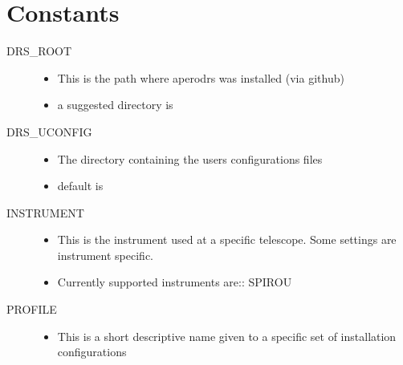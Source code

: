 \documentclass[a4paper,10pt,english]{report}
\begin{document}
\section{Constants}
\label{\detokenize{misc/glossary:constants}}\label{\detokenize{misc/glossary:glossary-constants}}\label{\detokenize{misc/glossary:glossary}}\label{\detokenize{misc/glossary::doc}}\begin{description}
\item[{DRS\_ROOT\label{\detokenize{misc/glossary:term-drs-root}}}] \leavevmode\begin{itemize}
\item {} 
This is the path where apero\sphinxhyphen{}drs was installed (via github)

\item {} 
a suggested directory is 

\end{itemize}

\item[{DRS\_UCONFIG\label{\detokenize{misc/glossary:term-drs-uconfig}}}] \leavevmode\begin{itemize}
\item {} 
The directory containing the users configurations files

\item {} 
default is 

\end{itemize}

\item[{INSTRUMENT\label{\detokenize{misc/glossary:term-instrument}}}] \leavevmode\begin{itemize}
\item {} 
This is the instrument used at a specific telescope. Some settings are instrument specific.

\item {} 
Currently supported instruments are::
SPIROU

\end{itemize}

\item[{PROFILE\label{\detokenize{misc/glossary:term-profile}}}] \leavevmode\begin{itemize}
\item {} 
This is a short descriptive name given to a specific set of installation configurations


\end{itemize}
\end{description}
\end{document}
